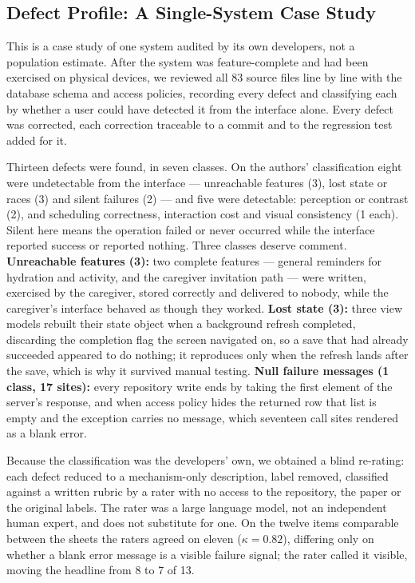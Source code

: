 \documentclass[runningheads,a4paper]{llncs}
\begin{document}
\subsection{Defect Profile: A Single-System Case Study}
\label{sec:defects}

This is a case study of one system audited by its own developers, not a population estimate.
After the system was feature-complete and had been exercised on physical devices, we
reviewed all 83 source files line by line with the database schema and access policies,
recording every defect and classifying each by whether a user could have detected it from
the interface alone. Every defect was corrected, each correction traceable to a commit and
to the regression test added for it.

Thirteen defects were found, in seven classes. On the authors' classification eight were
undetectable from the interface --- unreachable features (3), lost state or races (3) and
silent failures (2) --- and five were detectable: perception or contrast (2), and
scheduling correctness, interaction cost and visual consistency (1 each). Silent here means
the operation failed or never occurred while the interface reported success or reported
nothing. Three classes deserve comment. \textbf{Unreachable features (3):} two complete
features --- general reminders for hydration and activity, and the caregiver invitation
path --- were written, exercised by the caregiver, stored correctly and delivered to
nobody, while the caregiver's interface behaved as though they worked. \textbf{Lost state
(3):} three view models rebuilt their state object when a background refresh completed,
discarding the completion flag the screen navigated on, so a save that had already
succeeded appeared to do nothing; it reproduces only when the refresh lands after the save,
which is why it survived manual testing. \textbf{Null failure messages (1 class, 17
sites):} every repository write ends by taking the first element of the server's response,
and when access policy hides the returned row that list is empty and the exception carries
no message, which seventeen call sites rendered as a blank error.

Because the classification was the developers' own, we obtained a blind re-rating: each
defect reduced to a mechanism-only description, label removed, classified against a written
rubric by a rater with no access to the repository, the paper or the original labels. The
rater was a large language model, not an independent human expert, and does not substitute
for one. On the twelve items comparable between the sheets the raters agreed on eleven
($\kappa = 0.82$), differing only on whether a blank error message is a visible failure
signal; the rater called it visible, moving the headline from 8 to 7 of 13.
\end{document}
